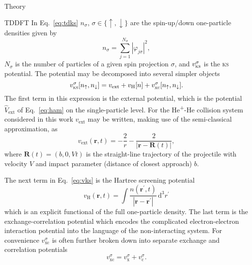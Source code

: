 \documentclass[aps, pra, reprint, groupedaddress, amsfonts, longbibliography,
               amsmath, amssymb, showpacs, nofootinbib]{revtex4-1}
\begin{document}
\begin{section}{Theory \label{sec:theory}}
\begin{subsection}{TDDFT \label{sec:tddft}}
      In Eq.~\eqref{eq:tdks} $n_\sigma$, $\sigma \in \{ \uparrow, \downarrow \}$ are the spin-up/down
      one-particle densities given by
      \begin{equation} \label{eq:spinden}
         n_\sigma = \sum\limits_{j=1}^{N_\sigma} \left| \varphi_{j\sigma} \right|^2,
      \end{equation}
      $N_\sigma$ is the number of particles of a given spin projection $\sigma$, and
      $v^\sigma_\textsc{ks}$ is the \textsc{ks} potential. The potential may be decomposed into several
      simpler objects
      \begin{equation} \label{eq:vks}
         v^\sigma_\mathrm{\textsc{ks}}[n_\uparrow, n_\downarrow] = v_\mathrm{ext} + v_\mathrm{H}[n]
                                                   + v^\sigma_\mathrm{xc}[n_\uparrow, n_\downarrow].
      \end{equation}
      The first term in this expression is the external potential, which is the potential
      $\hat{V}_\mathrm{ext}$ of Eq.~\eqref{eq:ham} on the single-particle level. For the
      He\textsuperscript{+}-He collision system considered in this work $v_\mathrm{ext}$ may be written,
      making use of the semi-classical approximation, as
      \begin{equation} \label{eq:hephe-ext}
         v_\mathrm{ext}(\mathbf{r},t) = -\frac{2}{r}
         - \frac{2}{\left| \mathbf{r} - \mathbf{R}(t) \right|},
      \end{equation}
      where $\mathbf{R}(t) = (b,0,V t)$ is the straight-line trajectory of the projectile with velocity
      $V$ and impact parameter (distance of closest approach) $b$.

      The next term in Eq.~\eqref{eq:vks} is the Hartree screening potential
      \begin{equation} \label{eq:vh}
         v_\mathrm{H}(\mathbf{r},t) = \int \frac{n(\mathbf{r}^\prime, t)}
            {\left| \mathbf{r} - \mathbf{r}^\prime\right|} \, \mathrm{d}^3 r^\prime
      \end{equation}
      which is an explicit functional of the full one-particle density. The last term is the
      exchange-correlation potential which encodes the complicated electron-electron interaction
      potential into the language of the non-interacting system. For convenience $v^\sigma_\mathrm{xc}$
      is often further broken down into separate exchange and correlation potentials
      \begin{equation} \label{eq:vxc}
         v^\sigma_\mathrm{xc} = v^\sigma_\mathrm{x} + v^\sigma_\mathrm{c}.
      \end{equation}


\end{subsection}
\end{section}
\end{document}
